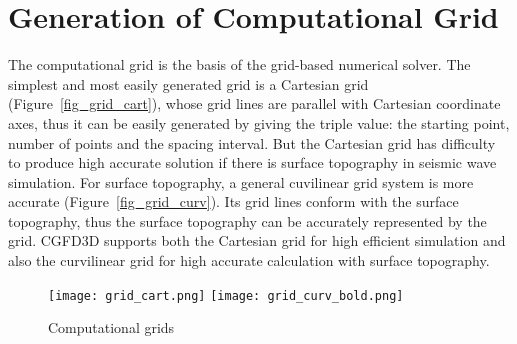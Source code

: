 \chapter{Generation of Computational Grid}\label{chapter-grid}

The computational grid is the basis of the grid-based numerical solver.
The simplest and most easily generated grid is a Cartesian grid (Figure~\ref{fig_grid_cart}), 
whose grid lines are parallel with Cartesian coordinate axes,
thus it can be easily generated by giving the triple value:
the starting point, number of points and the spacing interval.
But the Cartesian grid has difficulty to produce high accurate solution
if there is surface topography in seismic wave simulation.
For surface topography, a general cuvilinear grid system is more accurate (Figure~\ref{fig_grid_curv}).
Its grid lines conform with the surface topography,
thus the surface topography can be accurately represented by the grid.
CGFD3D supports both the Cartesian grid for high efficient simulation
and also the curvilinear grid for high accurate calculation with surface topography.

\begin{figure}[h!]
    \centering
        {\texttt{[image: grid\_cart.png]}}%
     \hspace{0.1\textwidth}
        {\texttt{[image: grid\_curv\_bold.png]}}%
    \caption{Computational grids}
    \label{fig_grid}
\end{figure}

%
%


